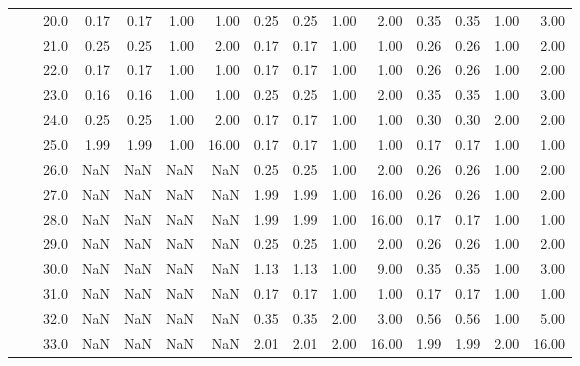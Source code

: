 \begin{tabular}{lllrrrrrrrrrrrr}
       &     & 20.0 &       0.17 &      0.17 & 1.00 &   1.00 &       0.25 &      0.25 &  1.00 &   2.00 &       0.35 &      0.35 &  1.00 &   3.00 \\
       &     & 21.0 &       0.25 &      0.25 & 1.00 &   2.00 &       0.17 &      0.17 &  1.00 &   1.00 &       0.26 &      0.26 &  1.00 &   2.00 \\
       &     & 22.0 &       0.17 &      0.17 & 1.00 &   1.00 &       0.17 &      0.17 &  1.00 &   1.00 &       0.26 &      0.26 &  1.00 &   2.00 \\
       &     & 23.0 &       0.16 &      0.16 & 1.00 &   1.00 &       0.25 &      0.25 &  1.00 &   2.00 &       0.35 &      0.35 &  1.00 &   3.00 \\
       &     & 24.0 &       0.25 &      0.25 & 1.00 &   2.00 &       0.17 &      0.17 &  1.00 &   1.00 &       0.30 &      0.30 &  2.00 &   2.00 \\
       &     & 25.0 &       1.99 &      1.99 & 1.00 &  16.00 &       0.17 &      0.17 &  1.00 &   1.00 &       0.17 &      0.17 &  1.00 &   1.00 \\
       &     & 26.0 &        NaN &       NaN &  NaN &    NaN &       0.25 &      0.25 &  1.00 &   2.00 &       0.26 &      0.26 &  1.00 &   2.00 \\
       &     & 27.0 &        NaN &       NaN &  NaN &    NaN &       1.99 &      1.99 &  1.00 &  16.00 &       0.26 &      0.26 &  1.00 &   2.00 \\
       &     & 28.0 &        NaN &       NaN &  NaN &    NaN &       1.99 &      1.99 &  1.00 &  16.00 &       0.17 &      0.17 &  1.00 &   1.00 \\
       &     & 29.0 &        NaN &       NaN &  NaN &    NaN &       0.25 &      0.25 &  1.00 &   2.00 &       0.26 &      0.26 &  1.00 &   2.00 \\
       &     & 30.0 &        NaN &       NaN &  NaN &    NaN &       1.13 &      1.13 &  1.00 &   9.00 &       0.35 &      0.35 &  1.00 &   3.00 \\
       &     & 31.0 &        NaN &       NaN &  NaN &    NaN &       0.17 &      0.17 &  1.00 &   1.00 &       0.17 &      0.17 &  1.00 &   1.00 \\
       &     & 32.0 &        NaN &       NaN &  NaN &    NaN &       0.35 &      0.35 &  2.00 &   3.00 &       0.56 &      0.56 &  1.00 &   5.00 \\
       &     & 33.0 &        NaN &       NaN &  NaN &    NaN &       2.01 &      2.01 &  2.00 &  16.00 &       1.99 &      1.99 &  2.00 &  16.00 \\

\end{tabular}
